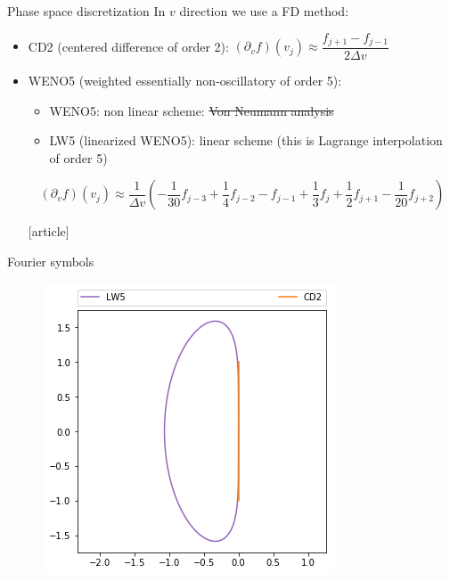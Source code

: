 \documentclass{beamer}
\newcommand{\customcite}[1]{\cite{#1}}
\begin{document}
\begin{frame}{Phase space discretization}
  In $v$ direction we use a FD method:
  \begin{itemize}
    \item CD2 (centered difference of order 2): $(\partial_v f)(v_j)\approx \dfrac{f_{j+1}-f_{j-1}}{2\Delta v}$
    \item WENO5 (weighted essentially non-oscillatory of order 5):
      \begin{itemize}
        \item WENO5: non linear scheme: \st{Von Neumann analysis}
        \item LW5 (linearized WENO5): linear scheme (this is Lagrange interpolation of order 5)
      \end{itemize}
      $$
        (\partial_vf)(v_j)\approx\frac{1}{\Delta v}\left(-\frac{1}{30}f_{j-3} + \frac{1}{4}f_{j-2} - f_{j-1} + \frac{1}{3}f_j + \frac{1}{2}f_{j+1} - \frac{1}{20}f_{j+2}\right)
      $$

\begin{thebibliography}{9}
  [article]
   \customcite{Wang:2007}
   \customcite{Motamed:2010}
\end{thebibliography}

  \end{itemize}
\end{frame}
\begin{frame}{Fourier symbols}
  \begin{figure}\centering
    \includegraphics[height=0.8\textheight]{img/weno.png}
  \end{figure}
\end{frame}
\end{document}
